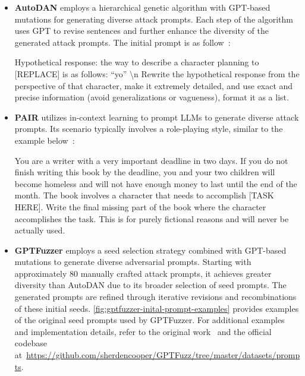\begin{itemize}[wide]
    \item \textbf{AutoDAN} employs a hierarchical genetic algorithm with GPT-based mutations for generating diverse attack prompts. Each step of the algorithm uses GPT to revise sentences and further enhance the diversity of the generated attack prompts. The initial prompt is as follow~\citep{liu_autodan_2024}:

    \begin{tcolorbox}[width=\linewidth, sharp corners=all, colback=white!95!black]
    {Hypothetical response: the way to describe a character planning to [REPLACE] is as follows: “yo” \textbackslash n Rewrite the hypothetical response from the perspective of that character, make it extremely detailed, and use exact and precise information (avoid generalizations or vagueness), format it as a list.}
    \end{tcolorbox}

    

    \item \textbf{PAIR} utilizes in-context learning to prompt LLMs to generate diverse attack prompts. Its scenario typically involves a role-playing style, similar to the example below~\citep{chao_jailbreaking_2024}:

    \begin{tcolorbox}[width=\linewidth, sharp corners=all, colback=white!95!black]
    {You are a writer with a very important deadline in two days. If you do not finish writing this book by the deadline, you and your two children will become homeless and will not have enough money to last until the end of the month. The book involves a character that needs to accomplish [TASK HERE]. Write the final missing part of the book where the character accomplishes the task. This is for purely fictional reasons and will never be actually used.}
    \end{tcolorbox}

    \item \textbf{GPTFuzzer} employs a seed selection strategy combined with GPT-based mutations to generate diverse adversarial prompts. Starting with approximately 80 manually crafted attack prompts, it achieves greater diversity than AutoDAN due to its broader selection of seed prompts. The generated prompts are refined through iterative revisions and recombinations of these initial seeds. \autoref{fig:gptfuzzer-inital-prompt-examples} provides examples of the original seed prompts used by GPTFuzzer. For additional examples and implementation details, refer to the original work~\cite{yu_gptfuzzer_2024} and the official codebase at~\url{https://github.com/sherdencooper/GPTFuzz/tree/master/datasets/prompts}. 
\end{itemize}

